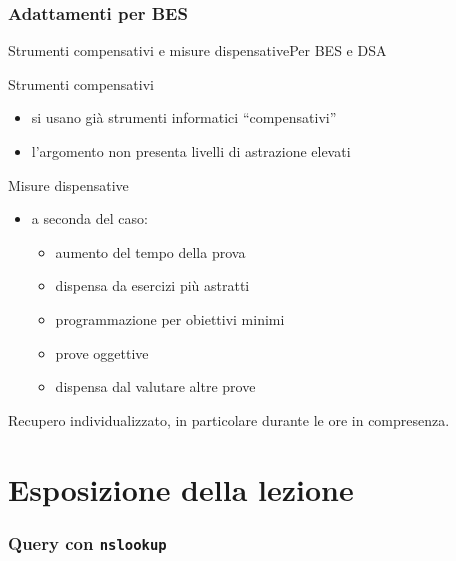 \documentclass[italian]{beamer}
\begin{document}
\section[Adattamenti per BES]{Adattamenti per BES}
\begin{frame}{Strumenti compensativi e misure dispensative}{Per BES e DSA}
	
	Strumenti compensativi
	\begin{itemize}
		\item si usano gi\`a strumenti informatici ``compensativi''
		\item l'argomento non presenta livelli di astrazione elevati
	\end{itemize}
	
	Misure dispensative
	
	\begin{itemize}
		\item a seconda del caso:
		\begin{itemize}
			\item aumento del tempo della prova
			\item dispensa da esercizi pi\`u astratti
			\item programmazione per obiettivi minimi
			\item prove oggettive
			\item dispensa dal valutare altre prove
		\end{itemize}
	\end{itemize}
	
	Recupero individualizzato, in particolare durante le ore in compresenza.
			
	\note{%
		
	}%
\end{frame}


\part[Lezione simulata]{Esposizione della lezione}
\frame{\partpage}

\section[nslookup]{Query con \texttt{nslookup}}
\end{document}
